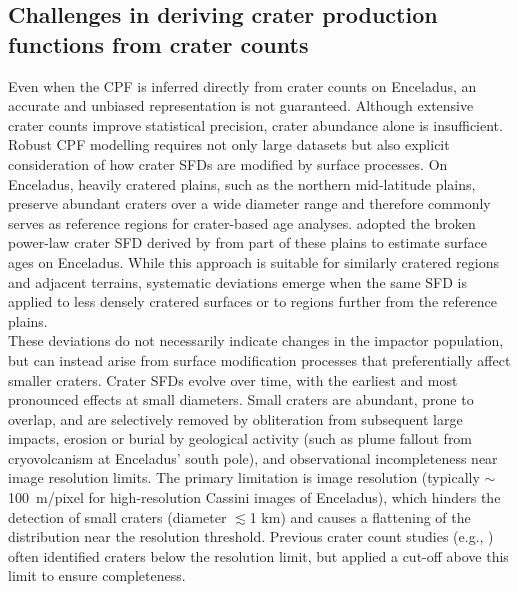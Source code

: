 \documentclass[preprint,11pt,3p,times,authoryear]{elsarticle}
\begin{document}
\subsection{Challenges in deriving crater production functions from crater counts}
Even when the CPF is inferred directly from crater counts on Enceladus, an accurate and unbiased representation is not guaranteed. Although extensive crater counts improve statistical precision, crater abundance alone is insufficient. Robust CPF modelling requires not only large datasets but also explicit consideration of how crater SFDs are modified by surface processes.
On Enceladus, heavily cratered plains, such as the northern mid-latitude plains, preserve abundant craters over a wide diameter range and therefore commonly serves as reference regions for crater-based age analyses. 
\citet{Wong2023} adopted the broken power-law crater SFD derived by \citet{Kirchoff2009} from part of these plains to estimate surface ages on Enceladus. While this approach is suitable for similarly cratered regions and adjacent terrains, systematic deviations emerge when the same SFD is applied to less densely cratered surfaces or to regions further from the reference plains.\\

These deviations do not necessarily indicate changes in the impactor population, but can instead arise from surface modification processes that preferentially affect smaller craters. Crater SFDs evolve over time, with the earliest and most pronounced effects at small diameters. Small craters are abundant, prone to overlap, and are selectively removed by obliteration from subsequent large impacts, erosion or burial by geological activity (such as plume fallout from cryovolcanism at Enceladus’ south pole), and observational incompleteness near image resolution limits. The primary limitation is image resolution (typically $\sim$100~m/pixel for high-resolution Cassini images of Enceladus), which hinders the detection of small craters (diameter $\lesssim$1 km) and causes a flattening of the distribution near the resolution threshold. Previous crater count studies (e.g., \citealt{Kirchoff2009, Kinczyk2024}) often identified craters below the resolution limit, but applied a cut-off above this limit to ensure completeness. \\
\end{document}
